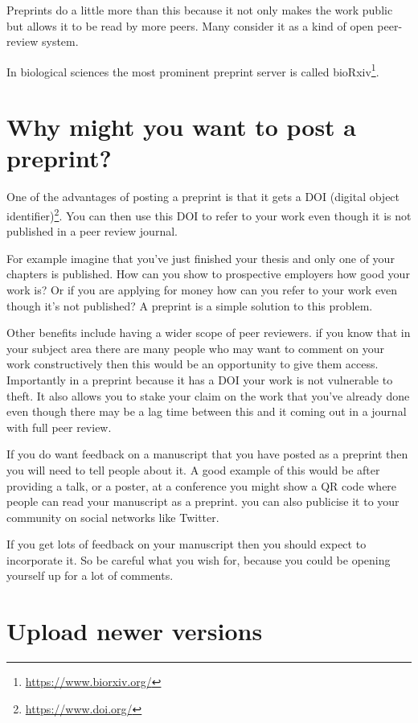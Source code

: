 \documentclass[
]{krantz}
\renewcommand{\href}[2]{#2\footnote{\url{#1}}}
\begin{document}
Preprints do a little more than this because it not only makes the work public but allows it to be read by more peers. Many consider it as a kind of open peer-review system.

In biological sciences the most prominent preprint server is called \href{https://www.biorxiv.org/}{bioRxiv}.

\hypertarget{why-might-you-want-to-post-a-preprint}{%
\section{Why might you want to post a preprint?}\label{why-might-you-want-to-post-a-preprint}}

One of the advantages of posting a preprint is that it gets a \href{https://www.doi.org/}{DOI (digital object identifier)}. You can then use this DOI to refer to your work even though it is not published in a peer review journal.

For example imagine that you've just finished your thesis and only one of your chapters is published. How can you show to prospective employers how good your work is? Or if you are applying for money how can you refer to your work even though it's not published? A preprint is a simple solution to this problem.

Other benefits include having a wider scope of peer reviewers. if you know that in your subject area there are many people who may want to comment on your work constructively then this would be an opportunity to give them access. Importantly in a preprint because it has a DOI your work is not vulnerable to theft. It also allows you to stake your claim on the work that you've already done even though there may be a lag time between this and it coming out in a journal with full peer review.

If you do want feedback on a manuscript that you have posted as a preprint then you will need to tell people about it. A good example of this would be after providing a talk, or a poster, at a conference you might show a QR code where people can read your manuscript as a preprint. you can also publicise it to your community on social networks like Twitter.

If you get lots of feedback on your manuscript then you should expect to incorporate it. So be careful what you wish for, because you could be opening yourself up for a lot of comments.

\hypertarget{upload-newer-versions}{%
\section{Upload newer versions}\label{upload-newer-versions}}
\end{document}
